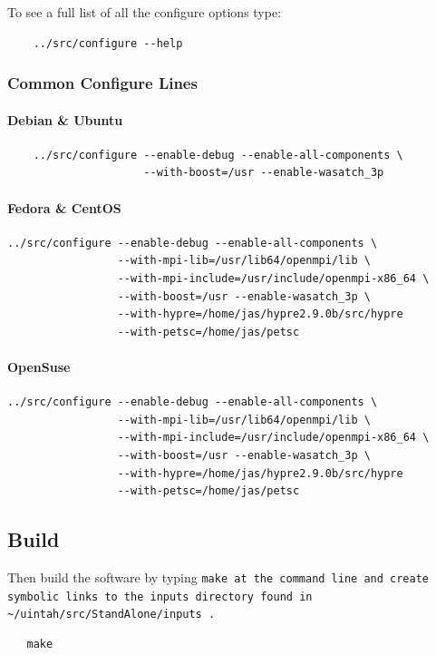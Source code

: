 \documentclass[12pt]{article}
\newcommand{\TT}[1]{\tt{#1} \normalfont}
\begin{document}
To see a full list of all the configure options type:

\begin{verbatim}
    ../src/configure --help
\end{verbatim}

\subsubsection{Common Configure Lines}

\paragraph{Debian \& Ubuntu}
\begin{verbatim}
    ../src/configure --enable-debug --enable-all-components \
                     --with-boost=/usr --enable-wasatch_3p
\end{verbatim}


\paragraph{Fedora \& CentOS}
\begin{verbatim}
../src/configure --enable-debug --enable-all-components \
                 --with-mpi-lib=/usr/lib64/openmpi/lib \
                 --with-mpi-include=/usr/include/openmpi-x86_64 \
                 --with-boost=/usr --enable-wasatch_3p \
                 --with-hypre=/home/jas/hypre2.9.0b/src/hypre 
                 --with-petsc=/home/jas/petsc
\end{verbatim}

\paragraph{OpenSuse}
\begin{verbatim}
../src/configure --enable-debug --enable-all-components \
                 --with-mpi-lib=/usr/lib64/openmpi/lib \
                 --with-mpi-include=/usr/include/openmpi-x86_64 \
                 --with-boost=/usr --enable-wasatch_3p \
                 --with-hypre=/home/jas/hypre2.9.0b/src/hypre 
                 --with-petsc=/home/jas/petsc
\end{verbatim}

\subsection{Build}

Then build the software by typing \TT{make} at the command line and create symbolic links to the inputs directory found in \TT{\textasciitilde/uintah/src/StandAlone/inputs}.
\begin{verbatim}
   make
\end{verbatim}
\end{document}
